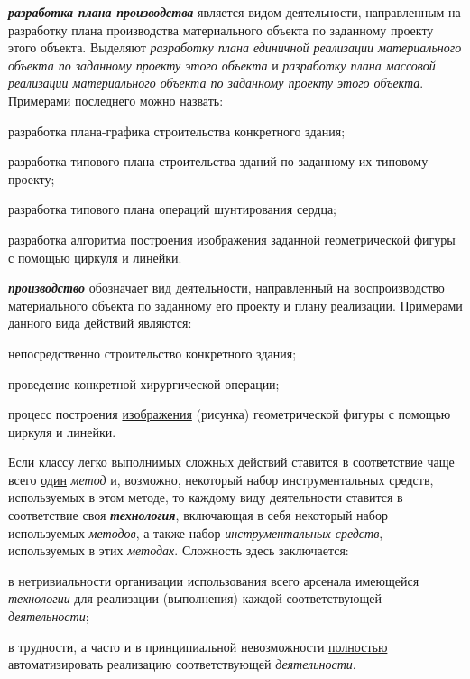\textbf{\textit{разработка плана производства}} является видом деятельности, направленным на разработку плана производства материального объекта по заданному проекту этого объекта. Выделяют \textit{разработку плана единичной реализации материального объекта по заданному проекту этого объекта} и \textit{разработку плана массовой реализации материального объекта по заданному проекту этого объекта}. Примерами последнего можно назвать:
\begin{textitemize}
	\item разработка плана-графика строительства конкретного здания;
	\item разработка типового плана строительства зданий по заданному их типовому проекту;
	\item разработка типового плана операций шунтирования сердца;
	\item разработка алгоритма построения \uline{изображения} заданной геометрической фигуры с помощью циркуля и линейки.
\end{textitemize}

\textbf{\textit{производство}} обозначает вид деятельности, направленный на воспроизводство материального объекта по заданному его проекту и плану реализации.
Примерами данного вида действий являются:
\begin{textitemize}
	\item непосредственно строительство конкретного здания;
	\item проведение конкретной хирургической операции;
	\item процесс построения \uline{изображения} (рисунка) геометрической фигуры с помощью циркуля и линейки.
\end{textitemize}

Если классу легко выполнимых сложных действий ставится в соответствие чаще всего \uline{один} \textit{метод} и, возможно, некоторый набор инструментальных средств, используемых в этом методе, то каждому виду деятельности ставится в соответствие своя \textbf{\textit{технология}}, включающая в себя некоторый набор используемых \textit{методов}, а также набор \textit{инструментальных средств}, используемых в этих \textit{методах}.
Сложность здесь заключается:
\begin{textitemize}
	\item в нетривиальности организации использования всего арсенала имеющейся \textit{технологии} для реализации (выполнения) каждой соответствующей \textit{деятельности};
	\item в трудности, а часто и в принципиальной невозможности \uline{полностью} автоматизировать реализацию соответствующей \textit{деятельности}.
\end{textitemize}

